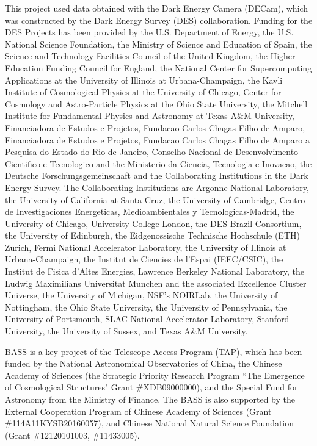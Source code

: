 \documentclass[twocolumn]{aastex631}
\begin{document}
This project used data obtained with the Dark Energy Camera (DECam), which was constructed by the Dark Energy Survey (DES) collaboration. Funding for the DES Projects has been provided by the U.S. Department of Energy, the U.S. National Science Foundation, the Ministry of Science and Education of Spain, the Science and Technology Facilities Council of the United Kingdom, the Higher Education Funding Council for England, the National Center for Supercomputing Applications at the University of Illinois at Urbana-Champaign, the Kavli Institute of Cosmological Physics at the University of Chicago, Center for Cosmology and Astro-Particle Physics at the Ohio State University, the Mitchell Institute for Fundamental Physics and Astronomy at Texas A\&M University, Financiadora de Estudos e Projetos, Fundacao Carlos Chagas Filho de Amparo, Financiadora de Estudos e Projetos, Fundacao Carlos Chagas Filho de Amparo a Pesquisa do Estado do Rio de Janeiro, Conselho Nacional de Desenvolvimento Cientifico e Tecnologico and the Ministerio da Ciencia, Tecnologia e Inovacao, the Deutsche Forschungsgemeinschaft and the Collaborating Institutions in the Dark Energy Survey. The Collaborating Institutions are Argonne National Laboratory, the University of California at Santa Cruz, the University of Cambridge, Centro de Investigaciones Energeticas, Medioambientales y Tecnologicas-Madrid, the University of Chicago, University College London, the DES-Brazil Consortium, the University of Edinburgh, the Eidgenossische Technische Hochschule (ETH) Zurich, Fermi National Accelerator Laboratory, the University of Illinois at Urbana-Champaign, the Institut de Ciencies de l'Espai (IEEC/CSIC), the Institut de Fisica d'Altes Energies, Lawrence Berkeley National Laboratory, the Ludwig Maximilians Universitat Munchen and the associated Excellence Cluster Universe, the University of Michigan, NSF's NOIRLab, the University of Nottingham, the Ohio State University, the University of Pennsylvania, the University of Portsmouth, SLAC National Accelerator Laboratory, Stanford University, the University of Sussex, and Texas A\&M University.

BASS is a key project of the Telescope Access Program (TAP), which has been funded by the National Astronomical Observatories of China, the Chinese Academy of Sciences (the Strategic Priority Research Program ``The Emergence of Cosmological Structures" Grant \#XDB09000000), and the Special Fund for Astronomy from the Ministry of Finance. The BASS is also supported by the External Cooperation Program of Chinese Academy of Sciences (Grant \#114A11KYSB20160057), and Chinese National Natural Science Foundation (Grant \#12120101003, \#11433005).
\end{document}
